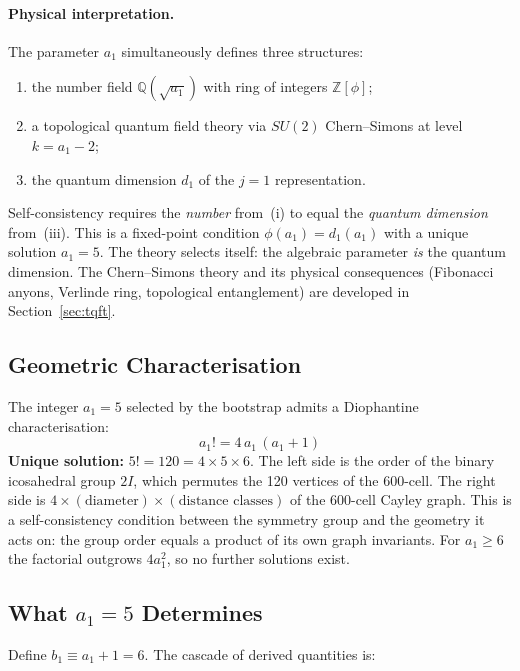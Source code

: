 \documentclass[12pt,a4paper]{article}
\theoremstyle{definition}
\begin{document}
\paragraph{Physical interpretation.}
The parameter $a_1$ simultaneously defines three structures:
\begin{enumerate}
\item[(i)] the number field $\mathbb{Q}(\sqrt{a_1})$ with ring of integers $\mathbb{Z}[\phi]$;
\item[(ii)] a topological quantum field theory via $SU(2)$ Chern--Simons at level $k = a_1 - 2$;
\item[(iii)] the quantum dimension $d_1$ of the $j = 1$ representation.
\end{enumerate}
Self-consistency requires the \emph{number} from~(i) to equal the \emph{quantum dimension} from~(iii).  This is a fixed-point condition $\phi(a_1) = d_1(a_1)$ with a unique solution $a_1 = 5$.  The theory selects itself: the algebraic parameter \emph{is} the quantum dimension.  The Chern--Simons theory and its physical consequences (Fibonacci anyons, Verlinde ring, topological entanglement) are developed in Section~\ref{sec:tqft}.

\subsection{Geometric Characterisation}

The integer $a_1 = 5$ selected by the bootstrap admits a Diophantine characterisation:
\begin{equation}
\boxed{a_1! = 4\,a_1\,(a_1 + 1)}
\label{eq:diophantine}
\end{equation}
\textbf{Unique solution:} $5! = 120 = 4 \times 5 \times 6$.  The left side is the order of the binary icosahedral group $2I$, which permutes the 120 vertices of the 600-cell.  The right side is $4 \times (\text{diameter}) \times (\text{distance classes})$ of the 600-cell Cayley graph.  This is a self-consistency condition between the symmetry group and the geometry it acts on: the group order equals a product of its own graph invariants.  For $a_1 \ge 6$ the factorial outgrows $4a_1^2$, so no further solutions exist.

\subsection{What \texorpdfstring{$a_1 = 5$}{a1 = 5} Determines}
\label{sec:cascade}

Define $b_1 \equiv a_1 + 1 = 6$. The cascade of derived quantities is:
\end{document}
